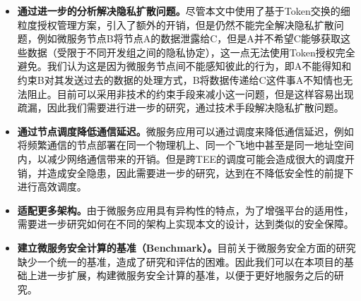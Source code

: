 \begin{itemize}
    \item \textbf{通过进一步的分析解决隐私扩散问题。}尽管本文中使用了基于Token交换的细粒度授权管理方案，引入了额外的开销，但是仍然不能完全解决隐私扩散问题，例如微服务节点B将节点A的数据泄露给C，但是A并不希望C能够获取这些数据（受限于不同开发组之间的隐私协定），这一点无法使用Token授权完全避免。我们认为这是因为微服务节点间不能感知彼此的行为，即A不能得知和约束B对其发送过去的数据的处理方式，B将数据传递给C这件事A不知情也无法阻止。目前可以采用非技术的约束手段来减小这一问题，但是这样容易出现疏漏，因此我们需要进行进一步的研究，通过技术手段解决隐私扩散问题。
    \item \textbf{通过节点调度降低通信延迟。}微服务应用可以通过调度来降低通信延迟，例如将频繁通信的节点部署在同一个物理机上、同一个飞地中甚至是同一地址空间内，以减少网络通信带来的开销。但是跨TEE的调度可能会造成很大的调度开销，并造成安全隐患，因此需要进一步的研究，达到在不降低安全性的前提下进行高效调度。
    \item \textbf{适配更多架构。}由于微服务应用具有异构性的特点，为了增强平台的适用性，需要进一步研究如何在不同的架构上实现本文的设计，达到类似的安全保障。
    \item \textbf{建立微服务安全计算的基准（Benchmark）。}目前关于微服务安全方面的研究缺少一个统一的基准，造成了研究和评估的困难。因此我们可以在本项目的基础上进一步扩展，构建微服务安全计算的基准，以便于更好地服务之后的研究。
\end{itemize}
